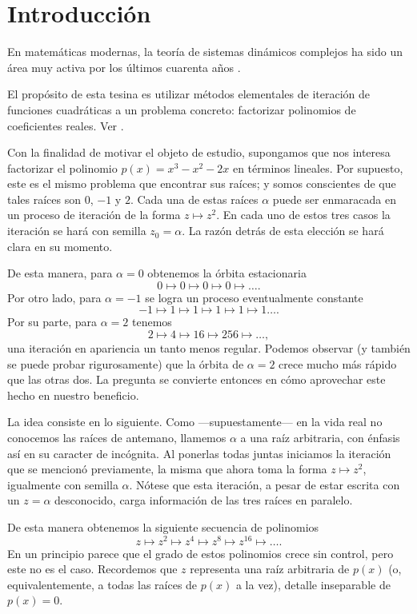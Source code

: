 \documentclass[oneside,11pt]{book}
\theoremstyle{definition}
\theoremstyle{plain}
\theoremstyle{remark}
\begin{document}
\tableofcontents


\chapter{Introducci\'on}

En matem\'aticas modernas, 
la teor\'ia de sistemas din\'amicos complejos ha sido un \'area muy activa por los \'ultimos cuarenta años \cite{Milnor}. 

El prop\'osito de esta tesina es utilizar m\'etodos elementales de iteraci\'on de funciones cuadr\'aticas a un problema concreto:
factorizar polinomios de coeficientes reales.
Ver \cite{PoirierRoots}.

Con la finalidad de motivar el objeto de estudio, 
supongamos que nos interesa factorizar el polinomio $p(x)=x^3-x^2-2x$ en t\'erminos lineales.
Por supuesto, este es el mismo problema que encontrar sus ra\'ices; 
y somos conscientes de que tales ra\'ices son $0$, $-1$ y $2$.
Cada una de estas ra\'ices $\alpha$ puede ser enmaracada en un proceso de iteraci\'on de la forma $z \mapsto z^2$.
En cada uno de estos tres casos la iteraci\'on se har\'a con semilla $z_0=\alpha$. 
La raz\'on detr\'as de esta elecci\'on se har\'a clara en su momento. 

De esta manera, para $\alpha=0$ obtenemos la \'orbita estacionaria 
$$
0 \mapsto 0 \mapsto 0 \mapsto 0 \mapsto \dots.
$$
Por otro lado, para $\alpha=-1$ se logra un proceso eventualmente constante
$$
-1 
\mapsto 1 \mapsto 1 \mapsto 1 \mapsto 1 \mapsto 1\dots.  
$$
Por su parte, para $\alpha=2$ tenemos 
$$
2 \mapsto 4\mapsto 16\mapsto 256\mapsto \dots, 
$$
una iteraci\'on en apariencia un tanto menos regular. 
Podemos observar 
(y tambi\'en se puede probar rigurosamente) 
que la \'orbita de $\alpha=2$ crece mucho m\'as r\'apido que las otras dos.
La pregunta se convierte entonces en c\'omo aprovechar este hecho en nuestro beneficio.

La idea consiste en lo siguiente.  
Como ---supuestamente--- en la vida real no conocemos las ra\'ices de antemano, 
llamemos $\alpha$ a una ra\'iz arbitraria, con \'enfasis as\'i en su caracter de inc\'ognita. 
Al ponerlas todas juntas iniciamos la iteraci\'on que se mencion\'o previamente, 
la misma que ahora toma la forma $z\mapsto z^2$, igualmente con semilla $\alpha$. 
N\'otese que esta iteraci\'on, a pesar de estar escrita con un $z=\alpha$ desconocido, 
carga informaci\'on de las tres ra\'ices en paralelo.

De esta manera obtenemos la siguiente secuencia de polinomios
$$
z \mapsto z^2 \mapsto z^4 \mapsto z^8 \mapsto z^{16} \mapsto \dots.
$$  
En un principio parece que el grado de estos polinomios crece sin control,
pero este no es el caso.
Recordemos que $z$ representa una ra\'iz arbitraria de $p(x)$
(o, equivalentemente, a todas las ra\'ices de $p(x)$ a la vez), 
detalle inseparable de $p(x)=0$.
\end{document}
